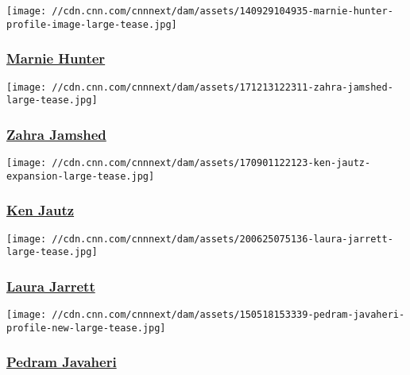 \href{/profiles/marnie-hunter}{}

\texttt{[image: //cdn.cnn.com/cnnnext/dam/assets/140929104935-marnie-hunter-profile-image-large-tease.jpg]}

\hypertarget{marnie-hunter}{%
\subsubsection{\texorpdfstring{\href{/profiles/marnie-hunter}{Marnie
Hunter}}{Marnie Hunter}}\label{marnie-hunter}}

\href{/profiles/zahra-jamshed}{}

\texttt{[image: //cdn.cnn.com/cnnnext/dam/assets/171213122311-zahra-jamshed-large-tease.jpg]}

\hypertarget{zahra-jamshed-}{%
\subsubsection{\texorpdfstring{\href{/profiles/zahra-jamshed}{Zahra
Jamshed }}{Zahra Jamshed }}\label{zahra-jamshed-}}

\href{/profiles/ken-jautz-profile}{}

\texttt{[image: //cdn.cnn.com/cnnnext/dam/assets/170901122123-ken-jautz-expansion-large-tease.jpg]}

\hypertarget{ken-jautz}{%
\subsubsection{\texorpdfstring{\href{/profiles/ken-jautz-profile}{Ken
Jautz}}{Ken Jautz}}\label{ken-jautz}}

\href{/profiles/laura-jarrett}{}

\texttt{[image: //cdn.cnn.com/cnnnext/dam/assets/200625075136-laura-jarrett-large-tease.jpg]}

\hypertarget{laura-jarrett}{%
\subsubsection{\texorpdfstring{\href{/profiles/laura-jarrett}{Laura
Jarrett}}{Laura Jarrett}}\label{laura-jarrett}}

\href{/profiles/pedram-javaheri-profile}{}

\texttt{[image: //cdn.cnn.com/cnnnext/dam/assets/150518153339-pedram-javaheri-profile-new-large-tease.jpg]}

\hypertarget{pedram-javaheri-}{%
\subsubsection{\texorpdfstring{\href{/profiles/pedram-javaheri-profile}{Pedram
Javaheri }}{Pedram Javaheri }}\label{pedram-javaheri-}}

